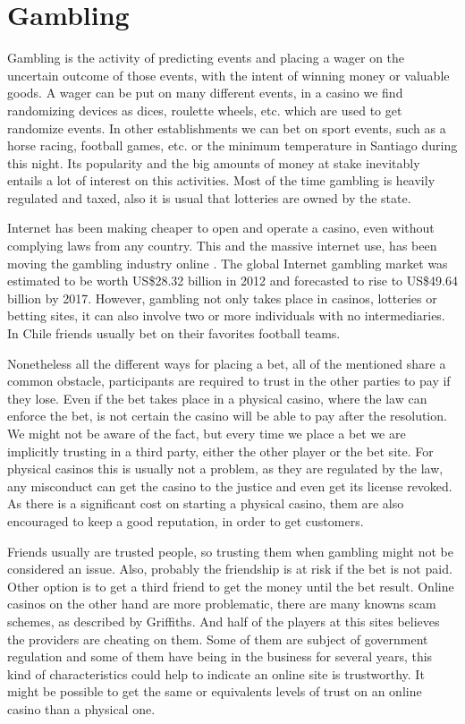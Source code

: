 \section{Gambling} \label{gambling}
Gambling is the activity of predicting events and placing a wager on the
  uncertain outcome of those events, with the intent of winning money or
  valuable goods.
A wager can be put on many different events, in a casino we find randomizing
  devices as dices, roulette wheels, etc. which are used to get randomize
  events. In other establishments we can bet on sport events, such as a horse
  racing, football games, etc. or the minimum temperature in Santiago during
  this night.
Its popularity and the big amounts of money at stake
  inevitably entails a lot of interest on this activities. Most of the time
  gambling is heavily regulated and taxed, also it is usual that lotteries are
  owned by the state.

Internet has been making cheaper to open and operate a casino, even without
  complying laws from any country.  This and the massive internet use, has been
  moving the gambling industry online\cite{shelat2002makes}
  \cite{griffiths2008internet}. The global Internet gambling market was
  estimated to be worth US\$28.32 billion in 2012 and forecasted to rise to
  US\$49.64 billion by 2017\cite{gainsbury2015risky}.
However, gambling not only takes place in casinos, lotteries or betting sites,
  it can also involve two or more individuals with no intermediaries. In Chile
  friends usually bet on their favorites football teams.

Nonetheless all the different ways for placing a bet, all of the mentioned
  share a common obstacle, participants are required to trust in the other
  parties to pay if they lose.
  Even if the bet takes place in a physical casino, where the law can enforce
  the bet, is not certain the casino will be able to pay after the resolution.
We might not be aware of the fact, but every time we place a bet we are
  implicitly trusting in a third party, either the other player or the bet
  site. For physical casinos this is usually not a problem, as they are
  regulated by the law, any misconduct can get the casino to the justice and
  even get its license revoked. As there is a significant cost on starting a
  physical casino, them are also encouraged to keep a good reputation, in order
  to get customers.

Friends usually are trusted people, so trusting them when gambling might not
  be considered an issue. Also, probably the friendship is at risk if the bet
  is not paid. Other option is to get a third friend to get the money until the
  bet result.
Online casinos on the other hand are more problematic, there are many knowns
  scam schemes, as described by Griffiths\cite{griffiths2010crime}. And
  half of the players at this sites believes the providers are cheating on
  them\cite{mcmullan2010online}. Some of them are subject of government
  regulation and some of them have being in the business for several years,
  this kind of characteristics could help to indicate an online site is
  trustworthy. It might be possible to get the same or equivalents levels of
  trust on an online casino than a physical one.

